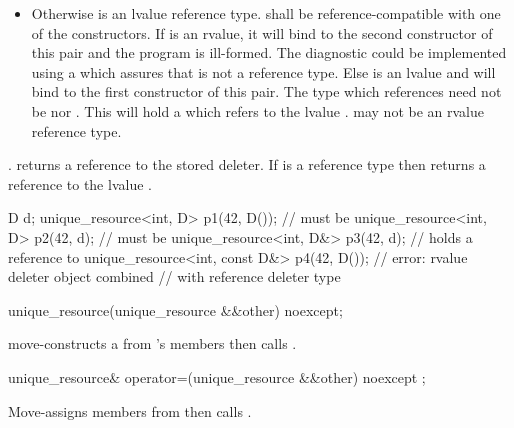 \documentclass[ebook,11pt,article]{memoir}
\begin{document}
\begin{itemdescr}
\begin{itemize}
\item Otherwise  is an lvalue reference type. 
shall be reference-compatible with one of the constructors. If  is
an rvalue, it will bind to the second constructor of this pair and the program is
ill-formed. \enternote The diagnostic could
be implemented using a  which assures that
 is not a reference type. \exitnote Else 
is an lvalue and will bind to the first constructor of this pair. The type
which  references need not be 
nor . This  will
hold a  which refers to the lvalue .
\enternote {} may not be an rvalue reference type.
\exitnote
\end{itemize}

\pnum
\postconditions {}.
 returns a reference to the stored
deleter. If  is a reference type then 
returns a reference to the lvalue .

\enterexample

\begin{codeblock}
D d;
unique_resource<int, D> p1(42, D());        //  must be 
unique_resource<int, D> p2(42, d);          //  must be 
unique_resource<int, D&> p3(42, d);         //  holds a reference to 
unique_resource<int, const D&> p4(42, D()); // error: rvalue deleter object combined
                                            // with reference deleter type
\end{codeblock}

\exitexample

\end{itemdescr}


\begin{itemdecl}
unique_resource(unique_resource &&other) noexcept;
\end{itemdecl}

\pnum
\effects move-constructs a  from 's members then calls .

\begin{itemdecl}
unique_resource& operator=(unique_resource  &&other) noexcept ;
\end{itemdecl}

\pnum
\effects {} Move-assigns members from  then calls .
\end{document}
